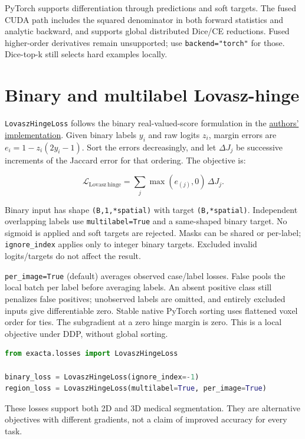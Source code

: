 PyTorch supports differentiation through predictions and soft targets. The fused CUDA path
includes the squared denominator in both forward statistics and analytic backward, and
supports global distributed Dice/CE reductions. Fused higher-order derivatives remain
unsupported; use \texttt{backend="torch"} for those. Dice-top-k still selects hard examples locally.

\section{Binary and multilabel Lovasz-hinge}\label{losses:binary-and-multilabel-lovasz-hinge}

\texttt{LovaszHingeLoss} follows the binary real-valued-score formulation in the
\href{https://github.com/bermanmaxim/LovaszSoftmax/blob/master/pytorch/lovasz_losses.py}{authors' implementation}.
Given binary labels \(y_i\) and raw logits \(z_i\), margin errors are
\(e_i=1-z_i(2y_i-1)\). Sort the errors decreasingly, and let \(\Delta J_j\) be successive
increments of the Jaccard error for that ordering. The objective is:

\[
\mathcal{L}_{\mathrm{Lovasz\ hinge}}=\sum_j\max(e_{(j)},0)\,\Delta J_j.
\]

Binary input has shape \texttt{(B,1,*spatial)} with target \texttt{(B,*spatial)}. Independent overlapping
labels use \texttt{multilabel=True} and a same-shaped binary target. No sigmoid is applied and
soft targets are rejected. Masks can be shared or per-label; \texttt{ignore\_index} applies only
to integer binary targets. Excluded invalid logits/targets do not affect the result.

\texttt{per\_image=True} (default) averages observed case/label losses. False pools the local batch
per label before averaging labels. An absent positive class still penalizes false positives;
unobserved labels are omitted, and entirely excluded inputs give differentiable zero.
Stable native PyTorch sorting uses flattened voxel order for ties. The subgradient at a
zero hinge margin is zero. This is a local objective under DDP, without global sorting.

\begin{lstlisting}[language=Python]
from exacta.losses import LovaszHingeLoss

binary_loss = LovaszHingeLoss(ignore_index=-1)
region_loss = LovaszHingeLoss(multilabel=True, per_image=True)
\end{lstlisting}

These losses support both 2D and 3D medical segmentation. They are alternative
objectives with different gradients, not a claim of improved accuracy for every task.

